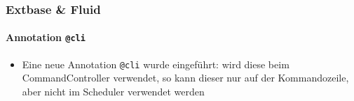 
\begin{frame}[fragile]
	\frametitle{Extbase \& Fluid}
	\framesubtitle{Annotation \texttt{@cli}}

	\begin{itemize}

		\item Eine neue Annotation \texttt{@cli} wurde eingeführt:\newline
			wird diese beim CommandController verwendet, so kann dieser nur auf der
			Kommandozeile, aber nicht im Scheduler verwendet werden

	\end{itemize}

\end{frame}


